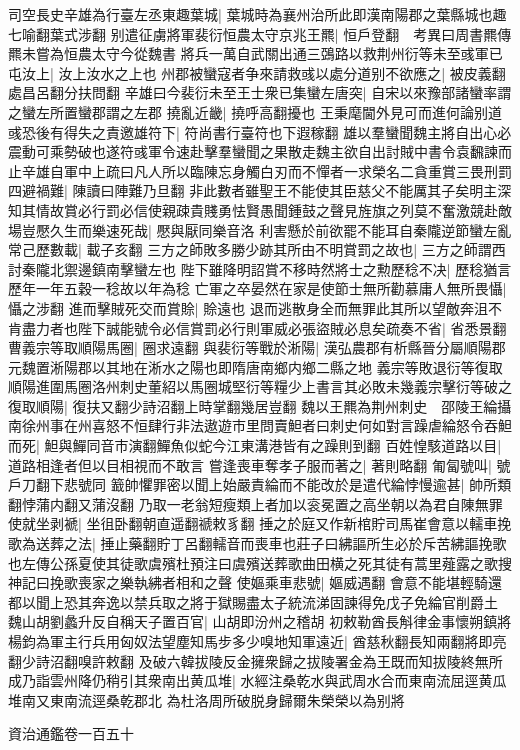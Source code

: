 司空長史辛雄為行臺左丞東趣葉城|{
	葉城時為襄州治所此即漢南陽郡之葉縣城也趣七喻翻葉式涉翻}
别遣征虜將軍裴衍恒農太守京兆王羆|{
	恒戶登翻　考異曰周書羆傳羆未嘗為恒農太守今從魏書}
將兵一萬自武關出通三鵶路以救荆州衍等未至彧軍已屯汝上|{
	汝上汝水之上也}
州郡被蠻寇者争來請救彧以處分道别不欲應之|{
	被皮義翻處昌呂翻分扶問翻}
辛雄曰今裴衍未至王士衆已集蠻左唐突|{
	自宋以來豫部諸蠻率謂之蠻左所置蠻郡謂之左郡}
撓亂近畿|{
	撓呼高翻擾也}
王秉麾閫外見可而進何論别道彧恐後有得失之責邀雄符下|{
	符尚書行臺符也下遐稼翻}
雄以羣蠻聞魏主將自出心必震動可乘勢破也遂符彧軍令速赴擊羣蠻聞之果散走魏主欲自出討賊中書令袁飜諫而止辛雄自軍中上疏曰凡人所以臨陳忘身觸白刃而不憚者一求榮名二貪重賞三畏刑罰四避禍難|{
	陳讀曰陣難乃旦翻}
非此數者雖聖王不能使其臣慈父不能厲其子矣明主深知其情故賞必行罰必信使親疎貴賤勇怯賢愚聞鍾鼓之聲見旌旗之列莫不奮激競赴敵場豈懕久生而樂速死哉|{
	懕與厭同樂音洛}
利害懸於前欲罷不能耳自秦隴逆節蠻左亂常己歷數載|{
	載子亥翻}
三方之師敗多勝少跡其所由不明賞罰之故也|{
	三方之師謂西討秦隴北禦邊鎮南擊蠻左也}
陛下雖降明詔賞不移時然將士之勲歷稔不决|{
	歷稔猶言歷年一年五穀一稔故以年為稔}
亡軍之卒晏然在家是使節士無所勸慕庸人無所畏懾|{
	懾之涉翻}
進而擊賊死交而賞賒|{
	賒遠也}
退而逃散身全而無罪此其所以望敵奔沮不肯盡力者也陛下誠能號令必信賞罰必行則軍威必張盜賊必息矣疏奏不省|{
	省悉景翻}
曹義宗等取順陽馬圈|{
	圈求遠翻}
與裴衍等戰於淅陽|{
	漢弘農郡有析縣晉分屬順陽郡元魏置淅陽郡以其地在淅水之陽也即隋唐南鄉内鄉二縣之地}
義宗等敗退衍等復取順陽進圍馬圈洛州刺史董紹以馬圈城堅衍等糧少上書言其必敗未幾義宗擊衍等破之復取順陽|{
	復扶又翻少詩沼翻上時掌翻幾居豈翻}
魏以王羆為荆州刺史　邵陵王綸攝南徐州事在州喜怒不恒肆行非法遨遊市里問賣䱇者曰刺史何如對言躁虐綸怒令吞䱇而死|{
	䱇與鱓同音市演翻鱓魚似蛇今江東溝港皆有之躁則到翻}
百姓惶駭道路以目|{
	道路相逢者但以目相視而不敢言}
嘗逢喪車奪孝子服而著之|{
	著則略翻}
匍匐號叫|{
	號戶刀翻下悲號同}
籖帥懼罪密以聞上始嚴責綸而不能改於是遣代綸悖慢逾甚|{
	帥所類翻悖蒲内翻又蒲沒翻}
乃取一老翁短瘦類上者加以衮冕置之高坐朝以為君自陳無罪使就坐剥褫|{
	坐徂卧翻朝直遥翻禠敕豸翻}
捶之於庭又作新棺貯司馬崔會意以轜車挽歌為送葬之法|{
	捶止藥翻貯丁呂翻轜音而喪車也莊子曰紼謳所生必於斥苦紼謳挽歌也左傳公孫夏使其徒歌虞殯杜預注曰虞殯送葬歌曲田横之死其徒有蒿里薤露之歌搜神記曰挽歌喪家之樂執紼者相和之聲}
使嫗乘車悲號|{
	嫗威遇翻}
會意不能堪輕騎還都以聞上恐其奔逸以禁兵取之將于獄賜盡太子統流涕固諫得免戊子免綸官削爵土　魏山胡劉蠡升反自稱天子置百官|{
	山胡即汾州之稽胡}
初敕勒酋長斛律金事懷朔鎮將楊鈞為軍主行兵用匈奴法望塵知馬步多少嗅地知軍遠近|{
	酋慈秋翻長知兩翻將即亮翻少詩沼翻嗅許敕翻}
及破六韓拔陵反金擁衆歸之拔陵署金為王既而知拔陵終無所成乃詣雲州降仍稍引其衆南出黄瓜堆|{
	水經注桑乾水與武周水合而東南流屈逕黄瓜堆南又東南流逕桑乾郡北}
為杜洛周所破脱身歸爾朱榮榮以為别將

資治通鑑卷一百五十
